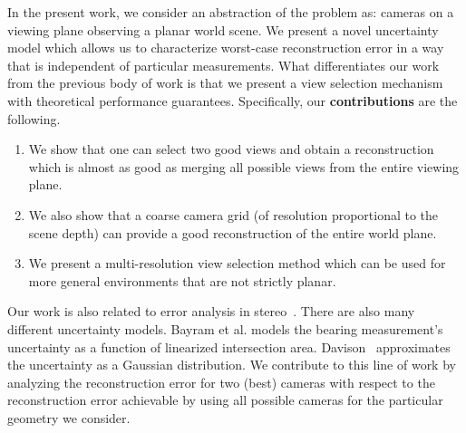 In the present work, we consider an abstraction of the problem as: cameras on a viewing plane observing a planar world scene. We present a novel uncertainty model which allows us to characterize worst-case reconstruction error in a way that is independent of particular measurements. What differentiates our work from the previous body of work is that we present a  view selection mechanism with theoretical performance guarantees. Specifically, our \textbf{contributions} are the following. 
\begin{enumerate}
    \item We show that one can select two good views and obtain a reconstruction which is almost as good as merging all possible views from the entire viewing plane.
    \item We also show that a coarse camera grid (of resolution proportional to the scene depth) can provide a good reconstruction of the entire world plane.
    \item We present a multi-resolution view selection method which can be used for more general environments that are not strictly planar. 
\end{enumerate}


Our work is also related to error analysis in
stereo~\cite{sahabi1996analysis,cheong1998effects}. 
There are also many different uncertainty models. Bayram et al. \cite{Bayram2016sensor} models the bearing measurement's uncertainty as a function of linearized intersection area. Davison~\cite{davison2003real} approximates the uncertainty as a Gaussian distribution. 
We contribute to this line of work by analyzing the reconstruction error for two (best)
cameras with respect to the reconstruction error achievable by using
all possible cameras for the particular geometry we consider.



